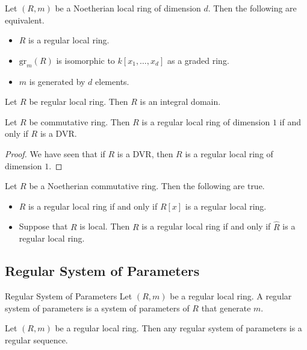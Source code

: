 \documentclass[a4paper]{article}
\begin{document}
\begin{prp}{}{} Let $(R,m)$ be a Noetherian local ring of dimension $d$. Then the following are equivalent. 
\begin{itemize}
\item $R$ is a regular local ring. 
\item $\text{gr}_m(R)$ is isomorphic to $k[x_1,\dots,x_d]$ as a graded ring. 
\item $m$ is generated by $d$ elements. 
\end{itemize}
\end{prp}

\begin{lmm}{}{} Let $R$ be regular local ring. Then $R$ is an integral domain. 
\end{lmm}

\begin{lmm}{}{} Let $R$ be commutative ring. Then $R$ is a regular local ring of dimension $1$ if and only if $R$ is a DVR. 
\begin{proof}
We have seen that if $R$ is a DVR, then $R$ is a regular local ring of dimension $1$. 
\end{proof}
\end{lmm}

\begin{lmm}{}{} Let $R$ be a Noetherian commutative ring. Then the following are true. 
\begin{itemize}
\item $R$ is a regular local ring if and only if $R[x]$ is a regular local ring. 
\item Suppose that $R$ is local. Then $R$ is a regular local ring if and only if $\widehat{R}$ is a regular local ring. 
\end{itemize}
\end{lmm}

\subsection{Regular System of Parameters}
\begin{defn}{Regular System of Parameters}{} Let $(R,m)$ be a regular local ring. A regular system of parameters is a system of parameters of $R$ that generate $m$. 
\end{defn}

\begin{prp}{}{} Let $(R,m)$ be a regular local ring. Then any regular system of parameters is a regular sequence. 
\end{prp}
\end{document}

